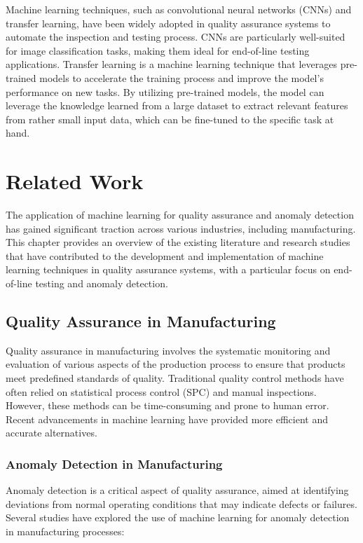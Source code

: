 \documentclass[lettersize,journal]{IEEEtran}
\begin{document}
Machine learning techniques, such as convolutional neural networks (CNNs) and transfer learning, have been widely adopted in quality assurance systems to automate the inspection and testing process. CNNs are particularly well-suited for image classification tasks, making them ideal for end-of-line testing applications. Transfer learning is a machine learning technique that leverages pre-trained models to accelerate the training process and improve the model's performance on new tasks. By utilizing pre-trained models, the model can leverage the knowledge learned from a large dataset to extract relevant features from rather small input data, which can be fine-tuned to the specific task at hand.
\section{Related Work}

The application of machine learning for quality assurance and anomaly detection has gained significant traction across various industries, including manufacturing. This chapter provides an overview of the existing literature and research studies that have contributed to the development and implementation of machine learning techniques in quality assurance systems, with a particular focus on end-of-line testing and anomaly detection.

\subsection*{Quality Assurance in Manufacturing}

Quality assurance in manufacturing involves the systematic monitoring and evaluation of various aspects of the production process to ensure that products meet predefined standards of quality. Traditional quality control methods have often relied on statistical process control (SPC) and manual inspections. However, these methods can be time-consuming and prone to human error. Recent advancements in machine learning have provided more efficient and accurate alternatives.

\subsubsection*{Anomaly Detection in Manufacturing}

Anomaly detection is a critical aspect of quality assurance, aimed at identifying deviations from normal operating conditions that may indicate defects or failures. Several studies have explored the use of machine learning for anomaly detection in manufacturing processes:
\end{document}
